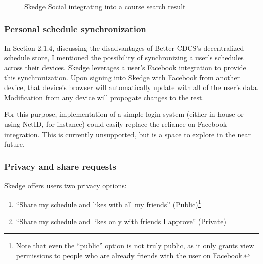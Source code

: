     \begin{figure}
      \centering
      \caption{Skedge Social integrating into a course search result} \label{fig:sk-social-course}
    \end{figure}

  \subsubsection{Personal schedule synchronization}

  In Section 2.1.4, discussing the disadvantages of Better CDCS's decentralized schedule store, I mentioned the possibility of synchronizing a user's schedules across their devices. Skedge leverages a user's Facebook integration to provide this synchronization. Upon signing into Skedge with Facebook from another device, that device's browser will automatically update with all of the user's data. Modification from any device will propogate changes to the rest.

  For this purpose, implementation of a simple login system (either in-house or using NetID, for instance) could easily replace the reliance on Facebook integration. This is currently unsupported, but is a space to explore in the near future.

  \subsubsection{Privacy and share requests}

  Skedge offers users two privacy options:

  \begin{enumerate}
  \item ``Share my schedule and likes with all my friends'' (Public)\footnote{Note that even the ``public'' option is not truly public, as it only grants view permissions to people who are already friends with the user on Facebook.}
  \item ``Share my schedule and likes only with friends I approve'' (Private)
  \end{enumerate}

